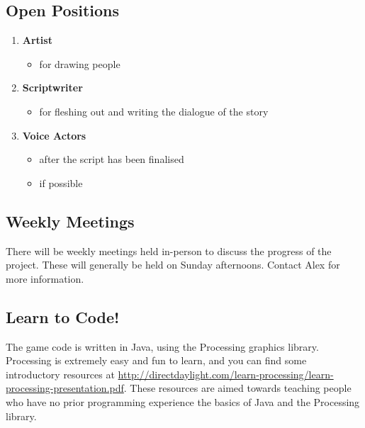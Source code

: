 \documentclass[11pt]{article}
\begin{document}
\subsection{Open Positions}
\begin{enumerate}
\item \textbf{Artist}
\begin{itemize}
\item for drawing people
\end{itemize}
\item \textbf{Scriptwriter}
\begin{itemize}
\item for fleshing out and writing the dialogue of the story
\end{itemize}
\item \textbf{Voice Actors}
\begin{itemize}
\item after the script has been finalised
\item if possible
\end{itemize}
\end{enumerate}
\subsection{Weekly Meetings}
There will be weekly meetings held in-person to discuss the progress of the project. These will generally be held on Sunday afternoons. Contact Alex for more information.
\subsection{Learn to Code!}
The game code is written in Java, using the Processing graphics library. Processing is extremely easy and fun to learn, and you can find some introductory resources at \url{http://directdaylight.com/learn-processing/learn-processing-presentation.pdf}. These resources are aimed towards teaching people who have no prior programming experience the basics of Java and the Processing library.
\end{document}
